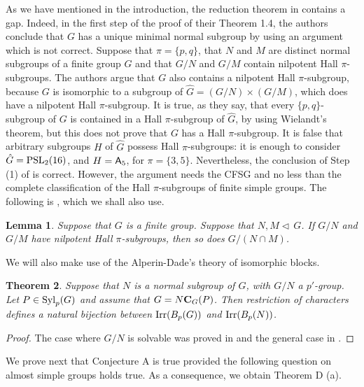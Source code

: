\documentclass[12pt,leqno,a4paper]{amsart}
\def\syl#1#2{{\rm Syl}_#1(#2)}
\def\nor{\triangleleft\,}
\def\cent#1#2{{\bf C}_{#1}(#2)}
\newtheorem{thm}{Theorem}[section]
\newtheorem{lem}[thm]{Lemma}
\theoremstyle{remark}
\begin{document}
 As we have mentioned in the introduction,
 the reduction theorem in \cite{LWXZ} contains a gap.
 Indeed, in the first step of the proof of their Theorem 1.4,
 the authors conclude that $G$ has a unique minimal normal subgroup
 by using an argument which is not correct. 
 Suppose that $\pi=\{p,q\}$, 
 that $N$ and $M$ are distinct normal subgroups
 of a finite group $G$ and that $G/N$ and $G/M$ contain nilpotent Hall $\pi$-subgroups. 
 The authors argue that $G$ also contains a nilpotent Hall
 $\pi$-subgroup, because $G$ is isomorphic to a subgroup of $\hat G=(G/N) \times (G/M)$,
 which does have a nilpotent Hall $\pi$-subgroup. It is true, as they say, 
 that every $\{p,q\}$-subgroup of $G$ is contained in a Hall $\pi$-subgroup
 of $\hat G$, by using Wielandt's theorem, but this does not prove that $G$
 has a Hall $\pi$-subgroup. It is false that arbitrary
 subgroups $H$ of $\hat G$  possess
 Hall $\pi$-subgroups: it is enough to consider $\hat G={\rm PSL}_2(16)$, and $H={\sf A}_5$,
 for $\pi=\{3,5\}$. Nevertheless, the conclusion of Step (1) of \cite[Theorem 1.4]{LWXZ}
 is correct. However, the argument needs the CFSG and no less than
 the complete classification
 of the Hall $\pi$-subgroups of finite simple groups. The following is \cite[Corollary 8]{RV},
 which we shall also use.
 
 \begin{lem}\label{vdovin}
 Suppose that $G$ is a finite group. Suppose that
 $N, M \nor G$. If $G/N$ and $G/M$ have nilpotent
 Hall $\pi$-subgroups, then so does $G/(N\cap M)$.
 \end{lem}
 


We will also make use of the Alperin-Dade's theory of isomorphic blocks.

\begin{thm}\label{isomblocks}
Suppose that $N$ is a normal subgroup of $G$, with $G/N$ a $p'$-group.
Let $P \in \syl p G$ and assume that $G=N\cent GP$. Then restriction of characters defines
a natural bijection between ${\rm Irr}(B_p(G))$ and ${\rm Irr}(B_p(N))$.
 

\end{thm}

\begin{proof}
The case where $G/N$ is solvable was proved in \cite{Alp76} and the general case
in \cite{Dad77}. 
\end{proof}


We prove next that Conjecture A is true provided the following question on almost simple groups holds true. As a consequence, we 
 obtain Theorem D (a).
\end{document}
